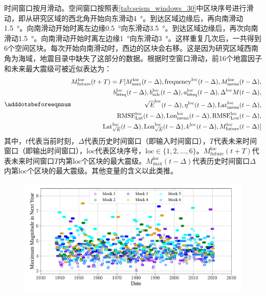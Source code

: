 时间窗口按月滑动。空间窗口按照表\ref{tab:seism_windows_30}中区块序号进行滑动，即从研究区域的西北角开始向东滑动\SI{4}{\degree}。到达区域边缘后，再向南滑动\SI{1.5}{\degree}。向南滑动开始时离左边缘\SI{0.5}{\degree}向东滑动\SI{3.5}{\degree}。到达区域边缘后，再次向南滑动\SI{1.5}{\degree}。向南滑动开始时离左边缘\SI{1}{\degree}向东滑动\SI{3}{\degree}。这样重复几次后，一共得到6个空间区块。每次开始向南滑动时，西边的区块会右移。这是因为研究区域西南角为海域，地震目录中缺失了这部分的数据。根据时空窗口滑动，前16个地震因子和未来最大震级可被近似表达为：
\begin{equation}\adddotsbeforeeqnnum
  \label{eq:seism_m_indicator}
  \begin{split}
    M_{\text{future}}^{\text{loc}}(t+T)=F[M_{\text{max}}^{\text{loc}}(t-\Delta),\text{frequency}^{\text{loc}}(t-\Delta),M_{\text{mean}}^{\text{loc}}(t-\Delta),\\
    b_{\text{lstsq}}^{\text{loc}}(t-\Delta),b_{\text{mle}}^{\text{loc}}(t-\Delta),a_{\text{lstsq}}^{\text{loc}}(t-\Delta),\Delta^{\text{loc}}M(t-\Delta),\\
    \sqrt{E}^{\text{loc}}(t-\Delta),\eta^{\text{loc}}(t-\Delta),\text{Lat}_{\text{mean}}^{\text{loc}}(t-\Delta),\\
    \text{RMSE}_{\text{Lat}}^{\text{loc}}(t-\Delta),\text{Lon}_{\text{mean}}^{\text{loc}}(t-\Delta),\text{RMSE}_{\text{Lon}}^{\text{loc}}(t-\Delta),
    \\
    \text{Lat}^{\text{loc}}_{\sqrt{E}}(t-\Delta),\text{Lon}^{\text{loc}}_{\sqrt{E}}(t-\Delta),k^{\text{loc}}(t-\Delta),M_{\text{future}}^{\text{loc}}(t-\Delta)]
  \end{split}
\end{equation}
其中，$t$代表当前时刻，$\Delta$代表历史时间窗口（即输入时间窗口），$T$代表未来时间窗口（即输出时间窗口），$\text{loc}$代表区块序号，$\text{loc}\in\{1,2,\ldots,6\}$。$M_{\text{future}}^{\text{loc}}(t+T)$代表未来时间窗口$T$内第$\text{loc}$个区块的最大震级。$M_{\text{max}}^{\text{loc}}(t-\Delta)$代表历史时间窗口$\Delta$内第$\text{loc}$个区块的最大震级。其他变量的含义以此类推。

\begin{figure}[!htbp]
  \centering
  \includegraphics[width=\textwidth]{Img/chap5_seism/seism_magnitude_index_1932_2021.pdf}
  \vspace{-1cm}
  \label{fig:seism_magnitude_index_1932_2021}
\end{figure}

